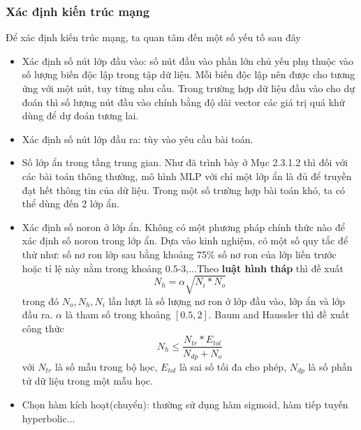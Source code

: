 \subsubsection{Xác định kiến trúc mạng}
Để xác định kiến trúc mạng, ta quan tâm đến một số yếu tố sau đây
\begin{itemize}
\item Xác định số nút lớp đầu vào: số nút đầu vào phần lớn chủ yếu phụ thuộc vào số lượng biến độc lập trong tập dữ liệu. Mỗi biến độc lập nên được cho tương ứng với một nút, tuy từng nhu cầu. Trong trường hợp dữ liệu đầu vào cho dự đoán thì số lượng nút đầu vào chính bằng độ dài vector các giá trị quá khứ dùng để dự đoán tương lai.
\item Xác định số nút lớp đầu ra: tùy vào yêu cầu bài toán.
\item Số lớp ẩn trong tầng trung gian. Như đã trình bày ở  Mục 2.3.1.2 thì đối với các bài toán thông thường, mô hình MLP với chỉ một lớp ẩn là đủ để truyền đạt hết thông tin của dữ liệu. Trong một số trường hợp bài toán khó, ta có thể dùng đến 2 lớp ẩn. 
\item Xác định số noron ở lớp ẩn. Không có một phương pháp chính thức nào để xác định số noron trong lớp ẩn. Dựa vào kinh nghiệm, có một số quy tắc để thử như: số nơ ron lớp sau bằng khoảng 75\% số nơ ron của lớp liền trước hoặc tỉ lệ này nằm trong khoảng 0.5-3,...Theo \textbf{luật hình tháp} thì đề xuất 
\begin{equation}
	N_h = \alpha \sqrt{N_i * N_o}
\end{equation}
trong đó {$N_o, N_h, N_i$} lần lượt là số lượng nơ ron ở lớp đầu vào, lớp ẩn và lớp đầu ra. $\alpha$ là tham số trong khoảng $[0.5,2]$. Baum and Haussler \citep{bau89}  thì đề xuất công thức
\begin{equation}
	N_h \leq \frac{N_{tr}*E_{tol}}{N_{dp}+N_o}
\end{equation}
với $N_{tr}$ là số mẫu trong bộ học, $E_{tol}$ là sai số tối đa cho phép, $N_{dp}$ là số phần tử dữ liệu trong một mẫu học.

\item Chọn hàm kích hoạt(chuyển): thường sử dụng hàm sigmoid, hàm tiếp tuyến hyperbolic...
\end{itemize}


